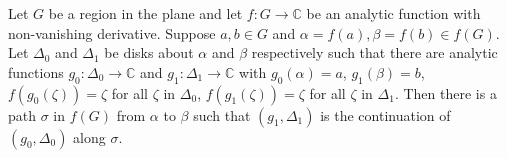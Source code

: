Let $G$ be a region in the plane and let $f: G \to \mathbb{C}$ be an analytic function with non-vanishing derivative. Suppose $a, b \in G$ and $\alpha = f(a), \beta = f(b) \in f(G)$. Let $\Delta_0$ and $\Delta_1$ be disks about $\alpha$ and $\beta$ respectively such that there are analytic functions $g_0: \Delta_0 \to \mathbb{C}$ and $g_1: \Delta_1 \to \mathbb{C}$ with $g_0(\alpha) = a$, $g_1(\beta) = b$, $f(g_0(\zeta)) = \zeta$ for all $\zeta$ in $\Delta_0$, $f(g_1(\zeta)) = \zeta$ for all $\zeta$ in $\Delta_1$. Then there is a path $\sigma$ in $f(G)$ from $\alpha$ to $\beta$ such that $(g_1, \Delta_1)$ is the continuation of $(g_0, \Delta_0)$ along $\sigma$.
